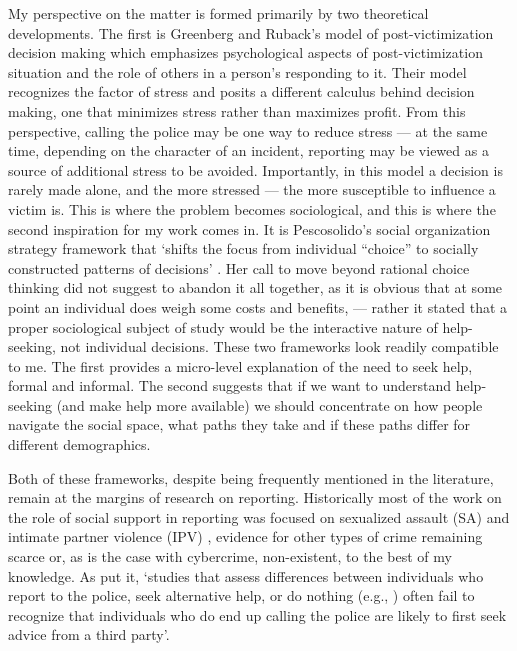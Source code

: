 \documentclass[]{interact}
\theoremstyle{plain}%
\theoremstyle{definition}
\theoremstyle{remark}
\newcommand\citep{\parencite}
\newcommand\citet{\textcite}
\begin{document}
	My perspective on the matter is formed primarily by two theoretical developments. The first is Greenberg and Ruback's model of post-victimization decision making \citep{ruback1984social, greenberg1992after} which emphasizes psychological aspects of post-victimization situation and the role of others in a person's responding to it. Their model recognizes the factor of stress and posits a different calculus behind decision making, one that minimizes stress rather than maximizes profit. From this perspective, calling the police may be one way to reduce stress --- at the same time, depending on the character of an incident, reporting may be viewed as a source of additional stress to be avoided. Importantly, in this model a decision is rarely made alone, and the more stressed --- the more susceptible to influence a victim is. This is where the problem becomes sociological, and this is where the second inspiration for my work comes in. It is Pescosolido's social organization strategy framework that `shifts the focus from individual ``choice'' to socially constructed patterns of decisions' \citep{pescosolido1992beyond}. Her call to move beyond rational choice thinking did not suggest to abandon it all together, as it is obvious that at some point an individual does weigh some costs and benefits, --- rather it stated that a proper sociological subject of study would be the interactive nature of help-seeking, not individual decisions. These two frameworks look readily compatible to me. The first provides a micro-level explanation of the need to seek help, formal and informal. The second suggests that if we want to understand help-seeking (and make help more available) we should concentrate on how people navigate the social space, what paths they take and if these paths differ for different demographics. 
	
	Both of these frameworks, despite being frequently mentioned in the literature, remain at the margins of research on reporting. Historically most of the work on the role of social support in reporting was focused on sexualized assault (SA) and intimate partner violence (IPV) \citep{paul2014does, patterson2010rape, baert2024factors, allen2007reporting}, evidence for other types of crime remaining scarce \citep{xie2019crime, bergemann2024social} or, as is the case with cybercrime, non-existent, to the best of my knowledge. As \citet{knoth2019reporting} put it, `studies that assess differences between individuals who report to the police, seek alternative help, or do nothing (e.g., \citet{kaukinen2002help}) often fail to recognize that individuals who do end up calling the police are likely to first seek advice from a third party'. 
	
\end{document}
